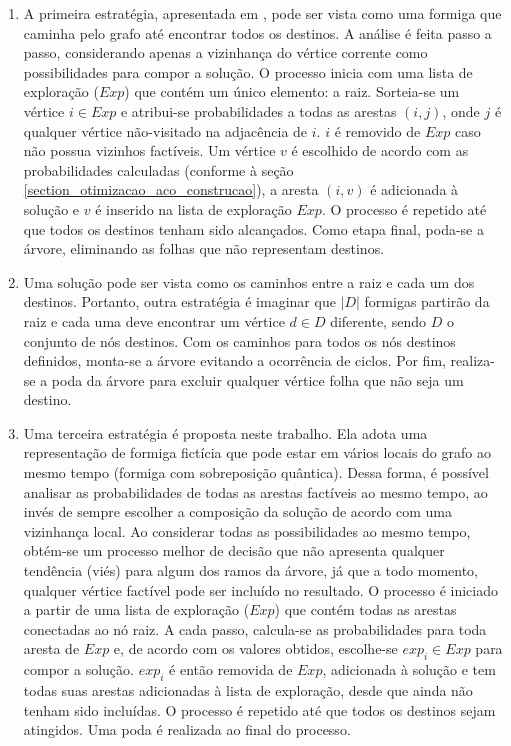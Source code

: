 \begin{enumerate}
	\item A primeira estratégia, apresentada em \cite{Pinto2005}, pode ser vista como uma formiga que caminha pelo grafo até encontrar todos os destinos. A análise é feita passo a passo, considerando apenas a vizinhança do vértice corrente como possibilidades para compor a solução. O processo inicia com uma lista de exploração ($Exp$) que contém um único elemento: a raiz. Sorteia-se um vértice $i \in Exp$ e atribui-se probabilidades a todas as arestas $(i, j)$, onde $j$ é qualquer vértice não-visitado na adjacência de $i$. $i$ é removido de $Exp$ caso não possua vizinhos factíveis. Um vértice $v$ é escolhido de acordo com as probabilidades calculadas (conforme à seção \ref{section_otimizacao_aco_construcao}), a aresta $(i, v)$ é adicionada à solução e $v$ é inserido na lista de exploração $Exp$. O processo é repetido até que todos os destinos tenham sido alcançados. Como etapa final, poda-se a árvore, eliminando as folhas que não representam destinos.
	\item Uma solução pode ser vista como os caminhos entre a raiz e cada um dos destinos. Portanto, outra estratégia é imaginar que $|D|$ formigas partirão da raiz e cada uma deve encontrar um vértice $d \in D$ diferente, sendo $D$ o conjunto de nós destinos. Com os caminhos para todos os nós destinos definidos, monta-se a árvore evitando a ocorrência de ciclos. Por fim, realiza-se a poda da árvore para excluir qualquer vértice folha que não seja um destino. %
	\item Uma terceira estratégia é proposta neste trabalho. Ela adota uma representação de formiga fictícia que pode estar em vários locais do grafo ao mesmo tempo (formiga com sobreposição quântica). Dessa forma, é possível analisar as probabilidades de todas as arestas factíveis ao mesmo tempo, ao invés de sempre escolher a composição da solução de acordo com uma vizinhança local. Ao considerar todas as possibilidades ao mesmo tempo, obtém-se um processo melhor de decisão que não apresenta qualquer tendência (viés) para algum dos ramos da árvore, já que a todo momento, qualquer vértice factível pode ser incluído no resultado. O processo é iniciado a partir de uma lista de exploração ($Exp$) que contém todas as arestas conectadas ao nó raiz. A cada passo, calcula-se as probabilidades para toda aresta de $Exp$ e, de acordo com os valores obtidos, escolhe-se $exp_i \in Exp$ para compor a solução. $exp_i$ é então removida de $Exp$, adicionada à solução e tem todas suas arestas adicionadas à lista de exploração, desde que ainda não tenham sido incluídas. O processo é repetido até que todos os destinos sejam atingidos. Uma poda é realizada ao final do processo.

\end{enumerate}
